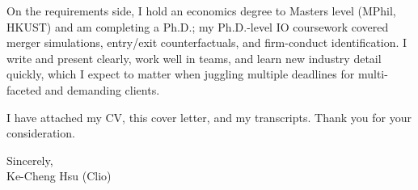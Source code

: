 \documentclass[11pt,letterpaper]{article}
\begin{document}
On the requirements side, I hold an economics degree to Masters level (MPhil, HKUST) and am completing a Ph.D.; my Ph.D.-level IO coursework covered merger simulations, entry/exit counterfactuals, and firm-conduct identification. I write and present clearly, work well in teams, and learn new industry detail quickly, which I expect to matter when juggling multiple deadlines for multi-faceted and demanding clients.

I have attached my CV, this cover letter, and my transcripts. Thank you for your consideration.

\vspace{0.7em}
Sincerely,\\[1.0em]
Ke-Cheng Hsu (Clio)
\end{document}
